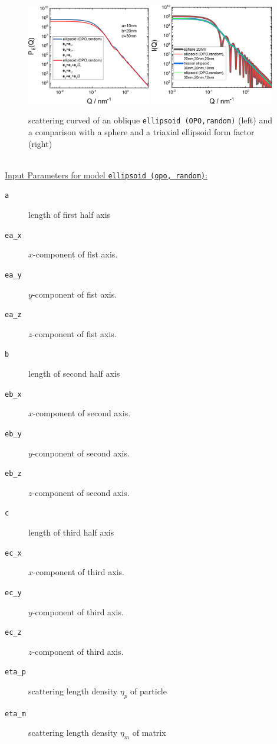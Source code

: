 \begin{figure}[htb]
\includegraphics[width=0.481\textwidth]{../images/form_factor/oriented_primitive_opbjects/ellipsoidOPOoblique.png} \hfill
\includegraphics[width=0.481\textwidth]{../images/form_factor/oriented_primitive_opbjects/ellipsoidOPOcompare.png}
\caption{scattering curved of an oblique \texttt{ellipsoid (OPO,random)} (left) and a comparison with a sphere and a triaxial ellipsoid form factor (right)}
\label{fig:opo_ellipsoidIQrandom}
\end{figure}

~\\
\uline{Input Parameters for model \texttt{ellipsoid (opo, random)}:}
\begin{description}
\item[\texttt{a}] length of first half axis
\item[\texttt{ea\_x}] $x$-component of fist axis.
\item[\texttt{ea\_y}] $y$-component of fist axis.
\item[\texttt{ea\_z}] $z$-component of fist axis.
\item[\texttt{b}] length of second half axis
\item[\texttt{eb\_x}] $x$-component of second axis.
\item[\texttt{eb\_y}] $y$-component of second axis.
\item[\texttt{eb\_z}] $z$-component of second axis.
\item[\texttt{c}] length of third half axis
\item[\texttt{ec\_x}] $x$-component of third axis.
\item[\texttt{ec\_y}] $y$-component of third axis.
\item[\texttt{ec\_z}] $z$-component of third axis.
\item[\texttt{eta\_p}] scattering length density $\eta_p$ of particle
\item[\texttt{eta\_m}] scattering length density $\eta_m$ of matrix
\end{description}

